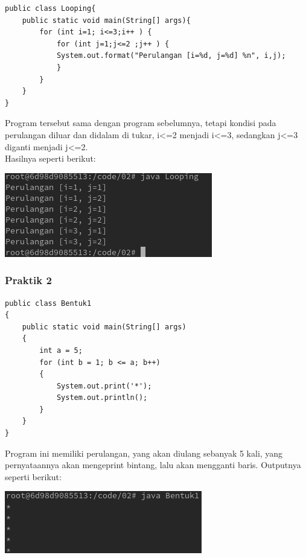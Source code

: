 \documentclass[a4paper,12pt]{article}
\begin{document}
\begin{lstlisting}
public class Looping{
    public static void main(String[] args){
        for (int i=1; i<=3;i++ ) {
            for (int j=1;j<=2 ;j++ ) {
            System.out.format("Perulangan [i=%d, j=%d] %n", i,j);
            }
        }
    }
}
\end{lstlisting}
Program tersebut sama dengan program sebelumnya, tetapi kondisi pada perulangan diluar dan didalam di tukar, i<=2 menjadi i<=3, sedangkan j<=3 diganti menjadi j<=2.\\
Hasilnya seperti berikut:\\
\begin{center}
    \includegraphics[scale=.7]{2.png}
\end{center}

\subsubsection{Praktik 2}
\begin{lstlisting}
public class Bentuk1
{
    public static void main(String[] args)
    {
        int a = 5;
        for (int b = 1; b <= a; b++)
        {
            System.out.print('*');
            System.out.println();
        }
    }
}
\end{lstlisting}
Program ini memiliki perulangan, yang akan diulang sebanyak 5 kali, yang pernyataannya akan mengeprint bintang, lalu akan mengganti baris. Outputnya seperti berikut:\\
\begin{center}
    \includegraphics[scale=.7]{3.png}
\end{center}

\newpage
\end{document}
